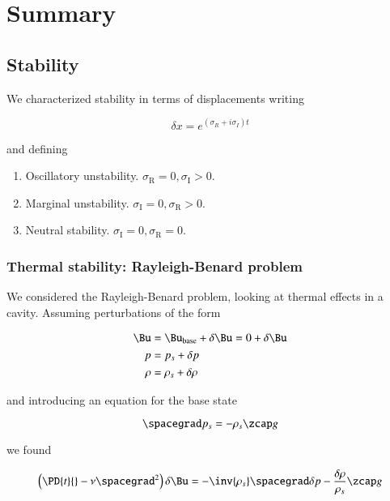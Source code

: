 \section{Summary}
\subsection{Stability}

We characterized stability in terms of displacements writing

\begin{equation}\label{eqn:continuumFluidsReview:2770}
\delta x = e^{(\sigma_R + i \sigma_I) t}
\end{equation}

and defining
\begin{enumerate}
\item Oscillatory unstability.  $\sigma_{\text{R}} = 0, \sigma_{\text{I}} > 0$.
\item Marginal unstability.  $\sigma_{\text{I}} = 0, \sigma_{\text{R}} > 0$.
\item Neutral stability.  $\sigma_{\text{I}} = 0, \sigma_{\text{R}} = 0$.
\end{enumerate}

\subsubsection{Thermal stability: Rayleigh-Benard problem}

We considered the Rayleigh-Benard problem, looking at thermal effects in a cavity.  Assuming perturbations of the form

\begin{align*}
\Bu &= \Bu_\text{base} + \delta \Bu = 0 + \delta \Bu \\
p &= p_s + \delta p \\
\rho &= \rho_s + \delta \rho
\end{align*}

and introducing an equation for the base state

\begin{equation}\label{eqn:continuumFluidsReview:2790}
\spacegrad p_s = -\rho_s \zcap g
\end{equation}

we found

\begin{equation}\label{eqn:continuumFluidsReview:2810}
\left( \PD{t}{} - \nu \spacegrad^2 \right) \delta \Bu = -\inv{\rho_s} \spacegrad \delta p - \frac{\delta \rho}{\rho_s} \zcap g
\end{equation}

